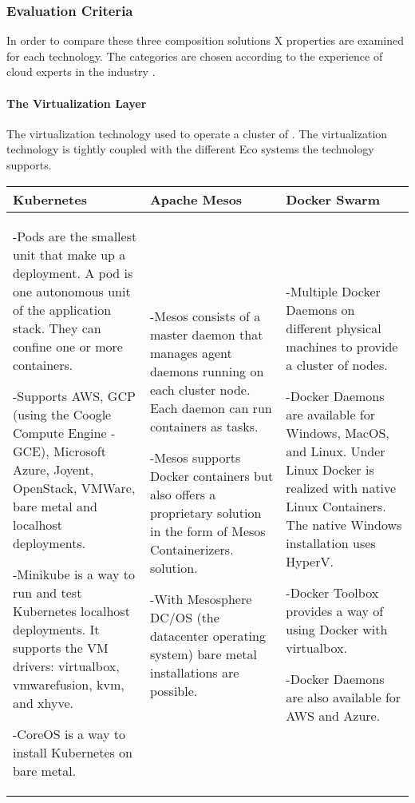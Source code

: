 \subsubsection{Evaluation Criteria}

In order to compare these three composition solutions X properties are examined
for each technology. The categories are chosen according to the experience of
cloud experts in the industry \cite{toll2016cloud_expert_eval}
\cite{lerilli2012cloud_eval_criteria} \cite{voras2011evaluating}.

\paragraph{The Virtualization Layer}

The virtualization technology used to operate a cluster of \mss{}. The
virtualization technology is tightly coupled with the different Eco systems the
technology supports.

\begin{center}
  \begin{tabular}{ | p{4.5cm} | p{4.5cm} | p{4.5cm} | }
    \hline
    \textbf{Kubernetes}&\textbf{Apache Mesos}&\textbf{Docker Swarm}\\\hline
    -Pods are the smallest unit that make up a deployment. A pod is one
    autonomous unit of the application stack. They can confine one or more
    containers.
    
    -Supports AWS, GCP (using the Coogle Compute Engine - GCE), Microsoft Azure,
    Joyent, OpenStack, VMWare, bare metal and localhost deployments.
    
    -Minikube is a way to run and test Kubernetes localhost deployments. It
    supports the VM drivers: virtualbox, vmwarefusion, kvm, and xhyve.
    
    -CoreOS is a way to install Kubernetes on bare metal.&
    
    -Mesos consists of a master daemon that manages agent daemons running on
    each cluster node. Each daemon can run containers as tasks. 
    
    -Mesos supports Docker containers but also offers a proprietary solution in
    the form of Mesos Containerizers. solution.
    
    -With Mesosphere DC/OS (the datacenter operating system) bare metal
    installations are possible. &
    
    -Multiple Docker Daemons on different physical machines to provide a cluster
    of nodes.
    
    -Docker Daemons are available for Windows, MacOS, and Linux. Under Linux
    Docker is realized with native Linux Containers. The native Windows
    installation uses HyperV.
    
    -Docker Toolbox provides a way of using Docker with virtualbox.
    
    -Docker Daemons are also available for AWS and Azure.\\
    \hline
  \end{tabular}
\end{center}


